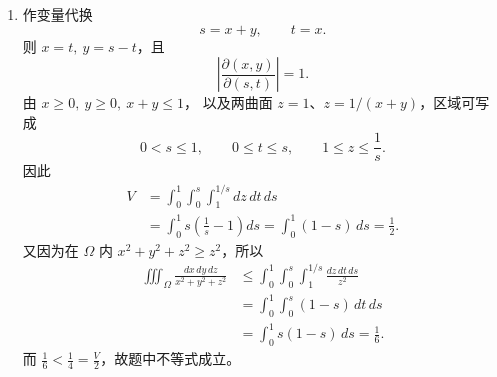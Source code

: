 \begin{enumerate}
{\begin{enumerate}
		令 $x=0$。因为此处级数收敛到 $1/2$，
		\[
		\frac12=\frac1{2\pi}
		+\frac1\pi\sum_{n=1}^{\infty}\frac{\sin n}{n}.
		\]
		故
		\[
		\boxed{\displaystyle
		\sum_{n=1}^{\infty}\frac{\sin n}{n}
		=\frac{\pi-1}{2}}.
		\]
		另一方面，经典正弦级数
		\[
		\sum_{n=1}^{\infty}\frac{\sin(nt)}n
		=\frac{\pi-t}{2},\qquad 0<t<2\pi,
		\]
		从 $0$ 到 $1$ 积分（积分后的级数绝对收敛），得到
		\[
		\begin{aligned}
		\sum_{n=1}^{\infty}\frac{1-\cos n}{n^2}
		&=\int_0^1\frac{\pi-t}{2}\,dt\\
		&=\boxed{\frac{\pi}{2}-\frac14}.
		\end{aligned}
		\]
		\item
		作变量代换
		\[
		s=x+y,\qquad t=x.
		\]
		则 $x=t,\ y=s-t$，且
		\[
		\left|\frac{\partial(x,y)}{\partial(s,t)}\right|=1.
		\]
		由 $x\geqslant0,\ y\geqslant0,\ x+y\leqslant1$，
		以及两曲面 $z=1$、$z=1/(x+y)$，区域可写成
		\[
		0<s\leqslant1,\qquad 0\leqslant t\leqslant s,\qquad
		1\leqslant z\leqslant\frac1s.
		\]
		因此
		\[
		\begin{aligned}
		V
		&=\int_0^1\int_0^s\int_1^{1/s}dz\,dt\,ds\\
		&=\int_0^1s\left(\frac1s-1\right)ds
		=\int_0^1(1-s)\,ds
		=\boxed{\frac12}.
		\end{aligned}
		\]
		又因为在 $\Omega$ 内 $x^2+y^2+z^2\geqslant z^2$，所以
		\[
		\begin{aligned}
		\iiint_\Omega\frac{dx\,dy\,dz}{x^2+y^2+z^2}
		&\leqslant
		\int_0^1\int_0^s\int_1^{1/s}\frac{dz\,dt\,ds}{z^2}\\
		&=\int_0^1\int_0^s(1-s)\,dt\,ds\\
		&=\int_0^1s(1-s)\,ds
		=\frac16.
		\end{aligned}
		\]
		而 $\frac16<\frac14=\frac V2$，故题中不等式成立。
	\end{enumerate}
}


	
\end{enumerate}
